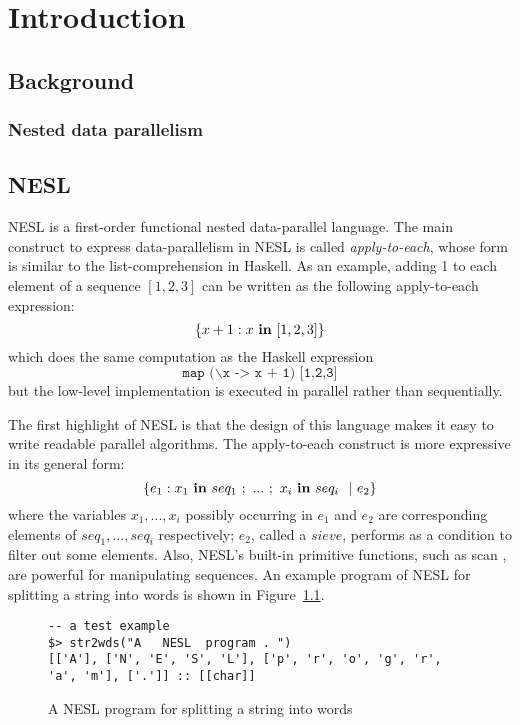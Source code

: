 
\chapter{Introduction}

\section{Background}
\subsection{Nested data parallelism}

\section{NESL}
NESL \cite{blel95nesl} is a first-order functional nested data-parallel language. The main construct to express data-parallelism in NESL is called \emph{apply-to-each}, whose form is similar to the list-comprehension in Haskell. 
As an example, adding 1 to each element of a sequence $[1,2,3]$ can be written as the following apply-to-each expression:
$$ \{x+1 : x \ \mathbf{in} \ [1,2,3] \}$$
which does the same computation as the Haskell expression 
$$\texttt{map ($\backslash$x -> x + 1) [1,2,3]}$$ 
but the low-level implementation is executed in parallel rather than sequentially. 

The first highlight of NESL is that the design of this language makes it easy to write readable parallel algorithms. The apply-to-each construct is more expressive in its general form:
$$ \{ e_1 :  x_1 \ \*{in} \ seq_1 \ ; \ ... \ ; \ x_i \  \*{in} \ seq_i \ \ | \ e_2  \}$$
where the variables $x_1, ...,x_i$ possibly occurring in $e_1$ and $e_2$ are corresponding elements of $seq_1,...,seq_i$ respectively; $e_2$, called a $sieve$, performs as a condition to filter out some elements. 
Also, NESL's built-in primitive functions, such as scan \cite{blel89scan}, are powerful for manipulating sequences.
An example program of NESL for splitting a string into words is shown in Figure~\ref{fig-nesl-wordpart}.

\begin{figure}
 
\begin{lstlisting}[style=nesl-style]
-- a test example
$> str2wds("A   NESL  program . ")
[['A'], ['N', 'E', 'S', 'L'], ['p', 'r', 'o', 'g', 'r', 'a', 'm'], ['.']] :: [[char]]
\end{lstlisting}
\caption{{A NESL program for splitting a string into words \label{fig-nesl-wordpart}}}
\end{figure}

